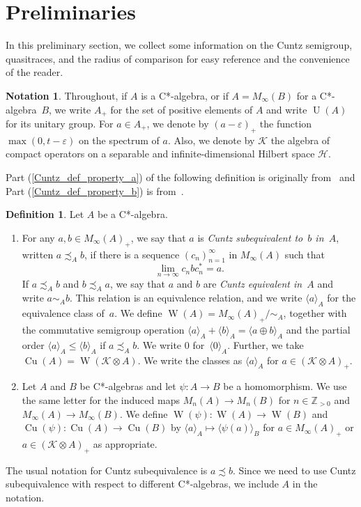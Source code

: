 \documentclass[10pt]{amsart}
\numberwithin{equation}{section}
\theoremstyle{definition}
\newtheorem{dfn}[thm]{Definition}
\newtheorem{ntn}[thm]{Notation}
\newcommand{\limi}[1]{\lim_{{#1} \to \infty}}
\newcommand{\ep}{\varepsilon}
\newcommand{\N}{{\mathbb{Z}}_{> 0}}
\newcommand{\Cu}{{\operatorname{Cu}}}
\newcommand{\W}{{\operatorname{W}}}
\newcommand{\U}{{\operatorname{U}}}
\newcommand{\cH}{{\mathcal{H}}}
\newcommand{\cK}{{\mathcal{K}}}
\newcommand{\Mi}{M_{\infty}}
\newcommand{\ca}{C*-algebra}
\newcommand{\hm}{homomorphism}
\begin{document}
\section{Preliminaries }\label{Sec_Prelim}
In this preliminary  section,
we collect
some information on the Cuntz semigroup, quasitraces,
and the radius of comparison  for easy reference and the convenience of the reader.
\begin{ntn}
Throughout, 
if $A$ is a \ca, or if $A = M_{\infty} (B)$
for a C*-algebra~$B$, we write $A_{+}$ for the
set of positive elements of $A$ and write $\U (A)$ for its
unitary group.
For $a \in A_+$, we denote by $(a -\ep)_+$ the function $\max(0,t-\ep)$ on the spectrum of $a$.
 Also, we denote by $\cK$ the algebra of compact operators on a separable
and infinite-dimensional Hilbert space $\cH$.
\end{ntn}
%
Part (\ref{Cuntz_def_property_a})
of the following definition is originally from~\cite{Cun78}
and Part (\ref{Cuntz_def_property_b}) is from~\cite{APT11}.
%
\begin{dfn}\label{Cuntz_def_property}
Let $A$ be a \ca.
%
\begin{enumerate}
%
\item\label{Cuntz_def_property_a}
For any $a, b \in M_{\infty} (A)_{+}$,
we say that $a$ is {\emph{Cuntz subequivalent to~$b$ in~$A$}},
written $a \precsim_{A} b$,
if there is a sequence $(c_n)_{n = 1}^{\infty}$ in $M_{\infty} (A)$
such that
\[
\limi{n} c_n b c_n^* = a.
\] 
If $a \precsim_{A} b$ and $b \precsim_{A} a$, 
we say that $a$ and $b$ are {\emph{Cuntz equivalent in~$A$}} and write $a \sim_{A} b$.
This relation is an equivalence relation,
and we write $\langle a \rangle_A$ for the equivalence class of~$a$.
We define $\W (A) = M_{\infty} (A)_{+} / \sim_A$,
together with the commutative semigroup operation
$\langle a \rangle_A + \langle b \rangle_A
 = \langle a \oplus b \rangle_A$
and the partial order
$\langle a \rangle_A \leq \langle b \rangle_A$
if $a \precsim_{A} b$.
We write $0$ for~$\langle 0 \rangle_A$.
Further, 
we take $\Cu (A) = \W (\cK \otimes A)$.
We write the classes as $\langle a \rangle_A$
for $a \in (\cK \otimes A)_{+}$.
%
\item\label{Cuntz_def_property_b}
Let $A$ and $B$ be C*-algebras
and let $\psi \colon A \to B$ be a \hm.
We use the same letter for the induced maps
$M_n (A) \to M_n (B)$
for $n \in \N$ and
$\Mi (A) \to \Mi (B)$.
We define
$\W (\psi) \colon \W (A) \to \W (B)$
and $\Cu (\psi) \colon \Cu (A) \to \Cu (B)$
by $\langle a \rangle_A \mapsto \langle \psi (a) \rangle_B$
for $a \in M_{\infty} (A)_{+}$
or $a \in (\cK \otimes A)_{+}$ as appropriate.
\end{enumerate}
%
\end{dfn}
The usual notation for Cuntz subequivalence is $a \precsim b$.
Since we need to use Cuntz subequivalence with respect to different C*-algebras,
we include $A$ in the notation.
%
\end{document}
